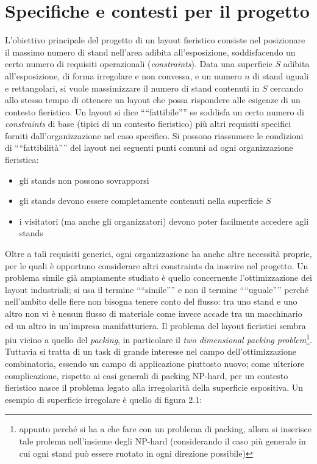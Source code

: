 \documentclass[12pt,a4paper,openright,twoside]{report}
\begin{document}
\section{Specifiche e contesti per il progetto}
L'obiettivo principale del progetto di un layout fieristico consiste nel posizionare il massimo numero di stand nell'area adibita all'esposizione, soddisfacendo un certo numero di requisiti operazionali (\textit{constraints}).
Data una superficie $S$ adibita all'esposizione, di forma irregolare e non convessa, e un numero $n$ di stand uguali e rettangolari, si vuole massimizzare il numero di stand contenuti in $S$ cercando allo stesso tempo di ottenere un layout che possa rispondere alle esigenze di un contesto fieristico. Un layout si dice "`"`fattibile"'"' se soddisfa un certo numero di \textit{constraints} di base (tipici di un contesto fieristico) pi\`{u} altri requisiti specifici forniti dall'organizzazione nel caso specifico.
Si possono riassumere le condizioni di "`"`fattibilit\`{a}"'"' del layout nei seguenti punti comuni ad ogni organizzazione fieristica:
\begin{itemize}
\item gli stands non possono sovrapporsi
\item gli stands devono essere completamente contenuti nella superficie $S$
\item i visitatori (ma anche gli organizzatori) devono poter facilmente accedere agli stands
\end{itemize}
Oltre a tali requisiti generici, ogni organizzazione ha anche altre necessit\`{a} proprie, per le quali \`{e} opportuno considerare altri constraints da inserire nel progetto. Un problema simile gi\`{a} ampiamente studiato \`{e} quello concernente l'ottimizzazione dei layout industriali; si usa il termine "`"`simile"'"' e non il termine "`"`uguale"'"' perch\'{e} nell'ambito delle fiere non bisogna tenere conto del flusso: tra uno stand e uno altro non vi \`{e} nessun flusso di materiale come invece accade tra un macchinario ed un altro in un'impresa manifatturiera. Il problema del layout fieristici sembra piu vicino a quello del \textit{packing}, in particolare il \textit{two dimensional packing problem}\footnote{appunto perch\'{e} si ha a che fare con un problema di packing, allora si inserisce tale prolema nell'insieme degli NP-hard (considerando il caso pi\`{u} generale in cui ogni stand pu\`{o} essere ruotato in ogni direzione possibile)}. Tuttavia si tratta di un task di grande interesse nel campo dell'ottimizzazione combinatoria, essendo un campo di applicazione piuttosto nuovo; come ulteriore complicazione, rispetto ai casi generali di packing NP-hard, per un contesto fieristico nasce il problema legato alla irregolarit\`{a} della superficie espositiva. Un esempio di superficie irregolare \`{e} quello di figura 2.1:
\end{document}
